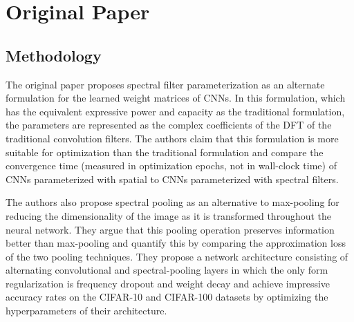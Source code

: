 \documentclass[10pt,journal,compsoc]{IEEEtran}
\begin{document}

\section{Original Paper}

\subsection{Methodology}
The original paper proposes spectral filter parameterization as an alternate formulation for the learned weight matrices of CNNs. In this formulation, which has the equivalent expressive power and capacity as the traditional formulation, the parameters are represented as the complex coefficients of the DFT of the traditional convolution filters. The authors claim that this formulation is more suitable for optimization than the traditional formulation and compare the convergence time (measured in optimization epochs, not in wall-clock time) of CNNs parameterized with spatial to CNNs parameterized with spectral filters. 

The authors also propose spectral pooling as an alternative to max-pooling for reducing the dimensionality of the image as it is transformed throughout the neural network. They argue that this pooling operation preserves information better than max-pooling and quantify this by comparing the approximation loss of the two pooling techniques. They propose a network architecture consisting of alternating convolutional and spectral-pooling layers in which the only form regularization is frequency dropout and weight decay and achieve impressive accuracy rates on the CIFAR-10 and CIFAR-100 datasets by optimizing the hyperparameters of their architecture.
\end{document}
